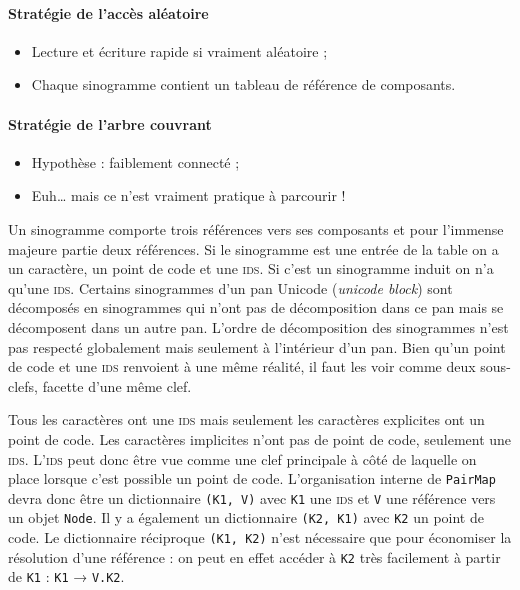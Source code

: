 \paragraph{Stratégie de l'accès aléatoire}
\begin{itemize}
\item Lecture et écriture rapide si vraiment aléatoire ;
\item Chaque sinogramme contient un tableau de référence de composants.
\end{itemize}

\paragraph{Stratégie de l'arbre couvrant}
\begin{itemize}
\item Hypothèse : faiblement connecté ;
\item Euh\dots{} mais ce n'est vraiment pratique à parcourir !
\end{itemize}

Un sinogramme comporte trois références vers ses composants et pour l'immense majeure partie deux références. Si le sinogramme est une entrée de la table on a un caractère, un point de code et une \textsc{ids}. Si c'est un sinogramme induit on n'a qu'une \textsc{ids}. Certains sinogrammes d'un pan Unicode (\textsl{unicode block}) sont décomposés en sinogrammes qui n'ont pas de décomposition dans ce pan mais se décomposent dans un autre pan. L'ordre de décomposition des sinogrammes n'est pas respecté globalement mais seulement à l'intérieur d'un pan. Bien qu'un point de code et une \textsc{ids} renvoient à une même réalité, il faut les voir comme deux sous-clefs, facette d'une même clef.

Tous les caractères ont une \textsc{ids} mais seulement les caractères explicites ont un point de code. Les caractères implicites n'ont pas de point de code, seulement une \textsc{ids}. L'\textsc{ids} peut donc être vue comme une clef principale à côté de laquelle on place lorsque c'est possible un point de code. L'organisation interne de \texttt{PairMap} devra donc être un dictionnaire \texttt{(K1, V)} avec \texttt{K1} une \textsc{ids} et \texttt{V} une référence vers un objet \texttt{Node}. Il y a également un dictionnaire \texttt{(K2, K1)} avec \texttt{K2} un point de code. Le dictionnaire réciproque \texttt{(K1, K2)} n'est nécessaire que pour économiser la résolution d'une référence : on peut en effet accéder à \texttt{K2} très facilement à partir de \texttt{K1} : \texttt{K1} → \texttt{V.K2}.

